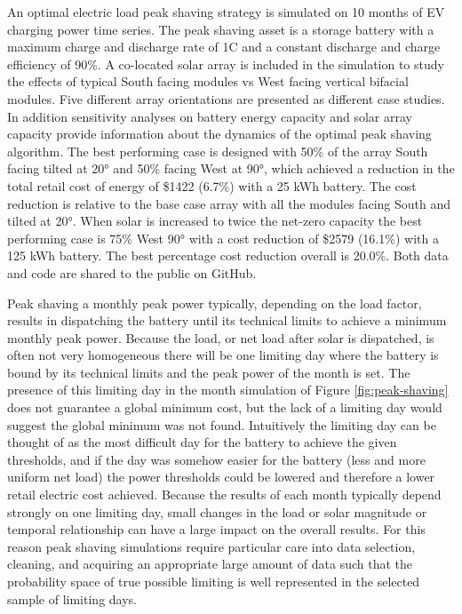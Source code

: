 \documentclass[journal,article,submit,pdftex,moreauthors]{Definitions/mdpi}
\begin{document}
An optimal electric load peak shaving strategy is simulated on 10 months
of EV charging power time series. The peak shaving asset is a storage
battery with a maximum charge and discharge rate of 1C and a constant
discharge and charge efficiency of 90\%. A co-located solar array is
included in the simulation to study the effects of typical South facing
modules vs West facing vertical bifacial modules. Five different array
orientations are presented as different case studies. In addition
sensitivity analyses on battery energy capacity and solar array capacity
provide information about the dynamics of the optimal peak shaving
algorithm. The best performing case is designed with 50\% of the array
South facing tilted at 20° and 50\% facing West at 90°, which achieved a
reduction in the total retail cost of energy of \$1422 (6.7\%) with a 25
kWh battery. The cost reduction is relative to the base case array with
all the modules facing South and tilted at 20°. When solar is increased
to twice the net-zero capacity the best performing case is 75\% West 90°
with a cost reduction of \$2579 (16.1\%) with a 125 kWh battery. The
best percentage cost reduction overall is 20.0\%. Both data and code are
shared to the public on GitHub.

Peak shaving a monthly peak power typically, depending on the load
factor, results in dispatching the battery until its technical limits to
achieve a minimum monthly peak power. Because the load, or net load
after solar is dispatched, is often not very homogeneous there will be
one limiting day where the battery is bound by its technical limits and
the peak power of the month is set. The presence of this limiting day in
the month simulation of Figure \ref{fig:peak-shaving} does not guarantee a global minimum
cost, but the lack of a limiting day would suggest the global minimum
was not found. Intuitively the limiting day can be thought of as the
most difficult day for the battery to achieve the given thresholds, and
if the day was somehow easier for the battery (less and more uniform net
load) the power thresholds could be lowered and therefore a lower retail
electric cost achieved. Because the results of each month typically
depend strongly on one limiting day, small changes in the load or solar
magnitude or temporal relationship can have a large impact on the
overall results. For this reason peak shaving simulations require
particular care into data selection, cleaning, and acquiring an
appropriate large amount of data such that the probability space of true
possible limiting is well represented in the selected sample of limiting
days.
\end{document}

